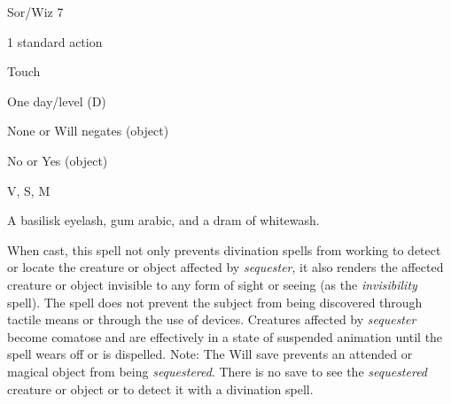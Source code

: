 
\begin{description*}
\item[Level:] Sor/Wiz 7
\item[Casting Time:] 1 standard action
\item[Range:] Touch
\item[Duration:] One day/level (D)
\item[Saving Throw:] None or Will negates (object)
\item[Spell Resistance:] No or Yes (object)
\item[Components:] V, S, M
\item[Arcane Material Component:] A basilisk eyelash, gum arabic, and a dram of whitewash.
\end{description*}

When cast, this spell not only prevents divination spells from working to detect
or locate the creature or object affected by \textit{sequester}, it also renders
the affected creature or object invisible to any form of sight or seeing (as the
\textit{invisibility} spell). The spell does not prevent the subject from being
discovered through tactile means or through the use of devices. Creatures affected
by \textit{sequester} become comatose and are effectively in a state of suspended
animation until the spell wears off or is dispelled.
Note: The Will save prevents an attended or magical object from being
\textit{sequestered}. There is no save to see the \textit{sequestered} creature
or object or to detect it with a divination spell.